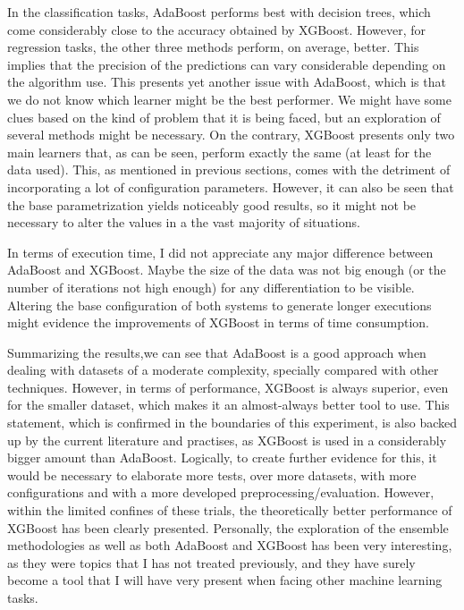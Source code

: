 \documentclass{article}
\begin{document}
In the classification tasks, AdaBoost performs best with decision trees, which come considerably close to the accuracy obtained by XGBoost. However, for regression tasks, the other three methods perform, on average, better. This implies that the precision of the predictions can vary considerable depending on the algorithm use. This presents yet another issue with AdaBoost, which is that we do not know which learner might be the best performer. We might have some clues based on the kind of problem that it is being faced, but an exploration of several methods might be necessary. On the contrary, XGBoost presents only two main learners that, as can be seen, perform exactly the same (at least for the data used). This, as mentioned in previous sections, comes with the detriment of incorporating a lot of configuration parameters. However, it can also be seen that the base parametrization yields noticeably good results, so it might not be necessary to alter the values in a the vast majority of situations.

In terms of execution time, I did not appreciate any major difference between AdaBoost and XGBoost. Maybe the size of the data was not big enough (or the number of iterations not high enough) for any differentiation to be visible. Altering the base configuration of both systems to generate longer executions might evidence the improvements of XGBoost in terms of time consumption.

Summarizing the results,we can see that AdaBoost is a good approach when dealing with datasets of a moderate complexity, specially compared with other techniques. However, in terms of performance, XGBoost is always superior, even for the smaller dataset, which makes it an almost-always better tool to use. This statement, which is confirmed in the boundaries of this experiment, is also backed up by the current literature and practises, as XGBoost is used in a considerably bigger amount than AdaBoost. Logically, to create further evidence for this, it would be necessary to elaborate more tests, over more datasets, with more configurations and with a more developed preprocessing/evaluation. However, within the limited confines of these trials, the theoretically better performance of XGBoost has been clearly presented. Personally, the exploration of the ensemble methodologies as well as both AdaBoost and XGBoost has been very interesting, as they were topics that I has not treated previously, and they have surely become a tool that I will have very present when facing other machine learning tasks.
\end{document}
